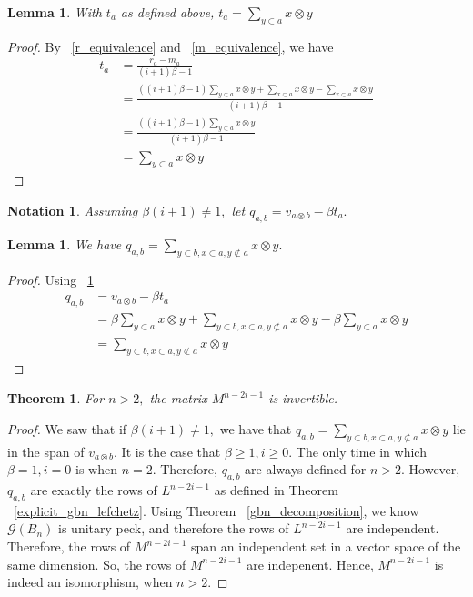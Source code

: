 \documentclass{amsart}
\newtheorem{lem}[subsubsection]{Lemma}
\newtheorem{thm}[subsubsection]{Theorem}
\newtheorem{note}[subsubsection]{Notation}
\begin{document}
\begin{lem}
\label{t_equivalence}
With $t_a$ as defined above, $t_a= \sum_{y\subset a}^{}x\otimes y $
\end{lem}
\begin{proof}
By ~\ref{r_equivalence} and ~\ref{m_equivalence}, we have
\begin{align*}
	t_a &= \frac{r_a - m_a}{(i+1)\beta - 1}\\
	&= \frac{((i+1)\beta-1)\sum_{y\subset a}^{}x\otimes y +\sum_{x\subset a}^{}x\otimes y-\sum_{x\subset a}^{}x\otimes y }{(i+1)\beta - 1}\\
	&= \frac{((i+1)\beta-1)\sum_{y\subset a}^{}x\otimes y}{(i+1)\beta - 1}\\
	&= \sum_{y\subset a}^{}x\otimes y
\end{align*}
\end{proof}



\begin{note}
Assuming $\beta(i+1) \neq 1,$ let $q_{a,b} = v_{a\otimes b} - \beta t_a.$
\end{note}

\begin{lem}
We have $q_{a,b} = \sum_{y\subset b,x \subset a,y\not\subset a}^{}x\otimes y.$
\end{lem}
\begin{proof}
Using ~\ref{t_equivalence}
\begin{align*}
	q_{a,b} &= v_{a\otimes b} - \beta t_a \\
	&= \beta \sum_{y \subset a}^{}x \otimes y + \sum_{y\subset b,x \subset a,y\not\subset a}^{}x\otimes y - \beta\sum_{y\subset a}^{}x\otimes y\\
	&= \sum_{y\subset b,x \subset a,y\not\subset a}^{}x\otimes y
\end{align*}
\end{proof}

\begin{thm}
For $n >2,$ the matrix $M^{n-2i-1}$ is invertible.
\end{thm}
\begin{proof}
We saw that if $\beta(i+1) \neq 1,$ we have that $q_{a,b} = \sum_{y\subset b,x \subset a,y\not\subset a}^{}x\otimes y$ lie in the span of $v_{a\otimes b}.$ It is the case that $\beta \geq 1,i \geq 0.$ The only time in which $\beta = 1,i=0$ is when $n = 2.$ Therefore, $q_{a,b}$ are always defined for $n > 2.$ However, $q_{a,b}$ are exactly the rows of $L^{n-2i-1}$ as defined in Theorem ~\ref{explicit_gbn_lefchetz}. Using Theorem ~\ref{gbn_decomposition}, we know $\mathcal G(B_n)$ is unitary peck, and therefore the rows of $L^{n-2i-1}$ are independent. Therefore, the rows of $M^{n-2i-1}$ span an independent set in a vector space of the same dimension. So, the rows of $M^{n-2i-1}$ are indepenent. Hence, $M^{n-2i-1}$ is indeed an isomorphism, when $n > 2.$
\end{proof}
\end{document}
